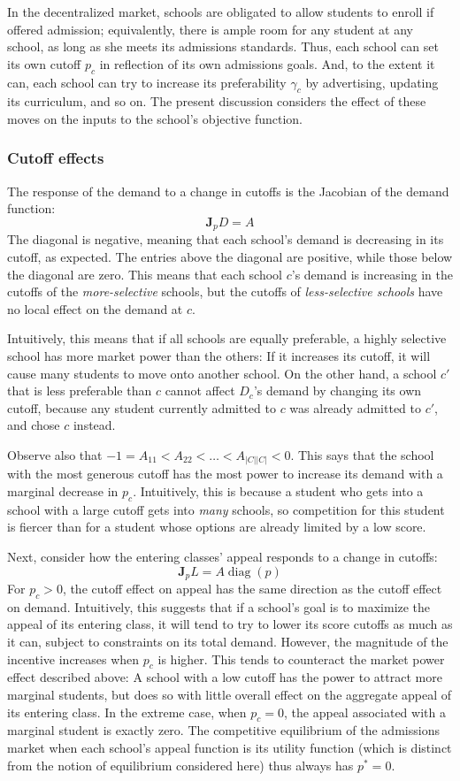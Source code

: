 \documentclass[12pt]{article}
\numberwithin{equation}{subsection}
\theoremstyle{definition}
\begin{document}
In the decentralized market, schools are obligated to allow students to enroll if offered admission; equivalently, there is ample room for any student at any school, as long as she meets its admissions standards. Thus, each school can set its own cutoff $p_c$ in reflection of its own admissions goals. And, to the extent it can, each school can try to increase its preferability $\gamma_c$ by advertising, updating its curriculum, and so on. The present discussion considers the effect of these moves on the inputs to the school's objective function. 

\subsubsection{Cutoff effects} \label{unconstrainedcutoffeffects}
The response of the demand to a change in cutoffs is the Jacobian of the demand function:
\[\mathbf{J}_p D = A \]
The diagonal is negative, meaning that each school's demand is decreasing in its cutoff, as expected. The entries above the diagonal are positive, while those below the diagonal are zero. This means that each school $c$'s demand is increasing in the cutoffs of the \emph{more-selective} schools, but the cutoffs of \emph{less-selective schools} have no local effect on the demand at $c$.

Intuitively, this means that if all schools are equally preferable, a highly selective school has more market power than the others: If it increases its cutoff, it will cause many students to move onto another school. On the other hand, a school $c'$ that is less preferable than $c$ cannot affect $D_c$'s demand by changing its own cutoff, because any student currently admitted to $c$ was already admitted to $c'$, and chose $c$ instead. 

Observe also that $-1 = A_{11} < A_{22} < \dots < A_{|C||C|} < 0$. This says that the school with the most generous cutoff has the most power to increase its demand with a marginal decrease in $p_c$. Intuitively, this is because a student who gets into a school with a large cutoff gets into \emph{many} schools, so competition for this student is fiercer than for a student whose options are already limited by a low score. 

Next, consider how the entering classes' appeal responds to a change in cutoffs:
\[\mathbf{J}_p L = A\operatorname{diag}(p)\]
For $p_c > 0$, the cutoff effect on appeal has the same direction as the cutoff effect on demand. Intuitively, this suggests that if a school's goal is to maximize the appeal of its entering class, it will tend to try to lower its score cutoffs as much as it can, subject to constraints on its total demand. However, the magnitude of the incentive increases when $p_c$ is higher. This tends to counteract the market power effect described above: A school with a low cutoff has the power to attract more marginal students, but does so with little overall effect on the aggregate appeal of its entering class. In the extreme case, when $p_c = 0$, the appeal associated with a marginal student is exactly zero. The competitive equilibrium of the admissions market when each school's appeal function is its utility function (which is distinct from the notion of equilibrium considered here) thus always has $p^* = 0$. 
\end{document}
